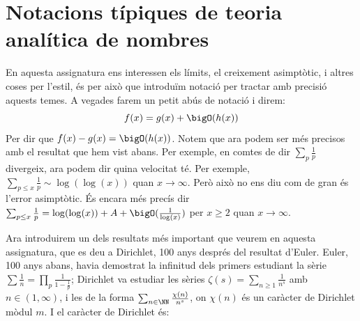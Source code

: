 \section{Notacions típiques de teoria analítica de nombres}
En aquesta assignatura ens interessen els límits, el creixement asimptòtic, i altres coses per l'estil, és per això que introduïm notació per tractar amb precisió aquests temes.
A vegades farem un petit abús de notació i direm:
\[f(x)=g(x)+\bigO(h(x))\]
Per dir que $f(x)-g(x)=\bigO(h(x))$.
Notem que ara podem ser més precisos amb el resultat que hem vist abans. Per exemple, en comtes de dir $\sum_p\frac{1}{p}$ divergeix, ara podem dir quina velocitat té. Per exemple, $\sum_{p\leq x}\frac{1}{p}\sim \log(\log(x))$ quan $x\rightarrow \infty$. Però això no ens diu com de gran és l'error asimptòtic. És encara més precís dir $\sum_{p\leq x}\frac{1}{p}=\log(\log(x))+A+\bigO(\frac{1}{\log(x)})$ per $x\geq 2$ quan $x\rightarrow \infty$.\par
Ara introduirem un dels resultats més important que veurem en aquesta assignatura, que es deu a Dirichlet, 100 anys després del resultat d'Euler.
Euler, 100 anys abans, havia demostrat la infinitud dels primers estudiant la sèrie $\sum\frac{1}{n}=\prod_{p}\frac{1}{1-\frac{1}{p}}$; Dirichlet va estudiar les sèries $\zeta(s)=\sum_{n\geq1}\frac{1}{n^s}$ amb $n\in(1,\infty)$, i les de la forma $\sum_{n\in\NN}\frac{\chi(n)}{n^s}$, on $\chi(n)$ és un caràcter de Dirichlet mòdul $m$. I el caràcter de Dirichlet és:
